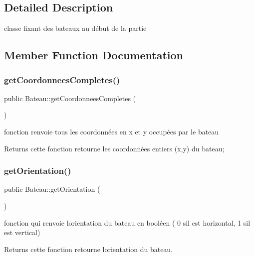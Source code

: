 \subsection{Detailed Description}
classe fixant des bateaux au début de la partie 

\subsection{Member Function Documentation}
\mbox{\label{class_bateau_a55c31fbdc2dc0c92786583d9bbd14985}} 
\subsubsection{\texorpdfstring{get\+Coordonnees\+Completes()}{getCoordonneesCompletes()}}
{\footnotesize\ttfamily public Bateau\+::get\+Coordonnees\+Completes (\begin{DoxyParamCaption}{ }\end{DoxyParamCaption})}



fonction renvoie tous les coordonnées en x et y occupées par le bateau 

\begin{DoxyReturn}{Returns}
cette fonction retourne les coordonnées entiers (x,y) du bateau; 
\end{DoxyReturn}
\mbox{\label{class_bateau_a693e60e6b97d17a04b3f10de4e68f741}} 
\subsubsection{\texorpdfstring{get\+Orientation()}{getOrientation()}}
{\footnotesize\ttfamily public Bateau\+::get\+Orientation (\begin{DoxyParamCaption}{ }\end{DoxyParamCaption})}



fonction qui renvoie l\textquotesingle{}orientation du bateau en booléen ( 0 s\textquotesingle{}il est horizontal, 1 s\textquotesingle{}il est vertical) 

\begin{DoxyReturn}{Returns}
cette fonction retourne l\textquotesingle{}orientation du bateau. 
\end{DoxyReturn}
\mbox{\label{class_bateau_a9f0b81c06a5760d0aa40bed0cb9d2a58}} 

